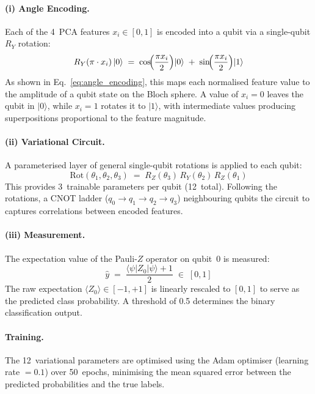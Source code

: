 \documentclass[runningheads]{llncs}
\begin{document}
\paragraph{(i) Angle Encoding.}
Each of the 4~PCA features $x_i \in [0,1]$ is encoded into a qubit via a single-qubit $R_Y$ rotation:
\begin{equation}
R_Y(\pi \cdot x_i)\,|0\rangle \;=\; \cos\!\Bigl(\frac{\pi x_i}{2}\Bigr)|0\rangle \;+\; \sin\!\Bigl(\frac{\pi x_i}{2}\Bigr)|1\rangle
\label{eq:angle_encoding}
\end{equation}
As shown in Eq.~\eqref{eq:angle_encoding}, this maps each normalised feature value to the amplitude of a qubit state on the Bloch sphere. A value of $x_i = 0$ leaves the qubit in $|0\rangle$, while $x_i = 1$ rotates it to $|1\rangle$, with intermediate values producing superpositions proportional to the feature magnitude.

\paragraph{(ii) Variational Circuit.}
A parameterised layer of general single-qubit rotations is applied to each qubit:
\begin{equation}
\text{Rot}(\theta_1, \theta_2, \theta_3) \;=\; R_Z(\theta_3)\,R_Y(\theta_2)\,R_Z(\theta_1)
\end{equation}
This provides 3~trainable parameters per qubit (12~total). Following the rotations, a CNOT ladder ($q_0 \!\to\! q_1 \!\to\! q_2 \!\to\! q_3$) neighbouring qubits the circuit to captures correlations between encoded features.

\paragraph{(iii) Measurement.}
The expectation value of the Pauli-$Z$ operator on qubit~0 is measured:
\begin{equation}
\hat{y} \;=\; \frac{\langle\psi|Z_0|\psi\rangle + 1}{2} \;\in\; [0,1]
\end{equation}
The raw expectation $\langle Z_0\rangle \in [-1, +1]$ is linearly rescaled to $[0,1]$ to serve as the predicted class probability. A threshold of 0.5 determines the binary classification output.

\paragraph{Training.}
The 12~variational parameters are optimised using the Adam optimiser (learning rate $= 0.1$) over 50~epochs, minimising the mean squared error between the predicted probabilities and the true labels.
\end{document}
